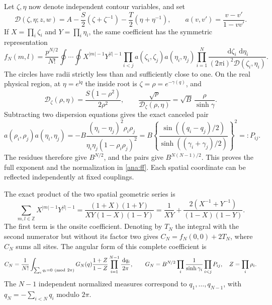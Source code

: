 \documentclass[11pt]{article}
\numberwithin{equation}{section}
\theoremstyle{definition}
\newcommand{\Z}{\mathbb Z}
\newcommand{\ii}{\mathrm i}
\newcommand{\dd}{\,\mathrm d}
\begin{document}
Let \(\zeta,\eta\) now denote independent contour variables, and set
\[
 \mathcal D(\zeta,\eta;z,w)=
 A-\frac S2(\zeta+\zeta^{-1})
  -\frac T2(\eta+\eta^{-1}),\qquad
 a(v,v')=\frac{v-v'}{1-vv'}.
\]
If \(X=\prod_i\zeta_i\) and \(Y=\prod_i\eta_i\), the same coefficient
has the symmetric representation
\begin{equation}\label{ana:doublecorr}
 f_N(m,l)=\frac{p^{N/2}}{N!}\oint\cdots\oint
 X^{|m|-1}Y^{|l|-1}
 \prod_{i<j}a(\zeta_i,\zeta_j)a(\eta_i,\eta_j)
 \prod_{i=1}^N
 \frac{\dd\zeta_i\,\dd\eta_i}{(2\pi\ii)^2\mathcal D(\zeta_i,\eta_i)}.
\end{equation}
The circles have radii strictly less than and sufficiently close to
one. On the real physical region, at \(\eta=e^{\ii q}\) the
inside root is \(\zeta=\rho=e^{-\gamma(q)}\), and
\[
 \mathcal D_\zeta(\rho,\eta)
   =\frac{S(1-\rho^2)}{2\rho^2},\qquad
 \frac{\sqrt p}{\mathcal D_\zeta(\rho,\eta)}
   =\sqrt B\,\frac{\rho}{\sinh\gamma}.
\]
Subtracting two dispersion equations gives the exact canceled pair
\begin{equation}\label{ana:pair}
 a(\rho_i,\rho_j)a(\eta_i,\eta_j)
 =-B\frac{(\eta_i-\eta_j)^2\rho_i\rho_j}
          {\eta_i\eta_j(1-\rho_i\rho_j)^2}
 =B\left\{\frac{\sin((q_i-q_j)/2)}
       {\sinh((\gamma_i+\gamma_j)/2)}\right\}^{\!2}
 =:P_{ij}.
\end{equation}
The residues therefore give \(B^{N/2}\), and the pairs give
\(B^{N(N-1)/2}\). This proves the full exponent and the normalization
in \eqref{ana:ff}. Each spatial coordinate can be reflected
independently at fixed couplings.

The exact product of the two spatial geometric series is
\begin{equation}\label{ana:fullsites}
 \sum_{m,l\in\Z}X^{|m|-1}Y^{|l|-1}
 =\frac{(1+X)(1+Y)}{XY(1-X)(1-Y)}
 =\frac1{XY}+\frac{2(X^{-1}+Y^{-1})}{(1-X)(1-Y)}.
\end{equation}
The first term is the onsite coefficient. Denoting by \(T_N\)
the integral with the second numerator but without its factor two
gives \(C_N=f_N(0,0)+2T_N\), where \(C_N\) sums all sites.
The angular form of this complete coefficient is
\begin{equation}\label{ana:angular}
 C_N=\frac1{N!}
 \int_{\sum_iq_i=0\ ({\rm mod}\ 2\pi)}
 G_N(q)\frac{1+Z}{1-Z}
 \prod_{i=1}^{N-1}\frac{\dd q_i}{2\pi},\qquad
 G_N=B^{N/2}\prod_i\frac1{\sinh\gamma_i}\prod_{i<j}P_{ij},
 \quad Z=\prod_i\rho_i.
\end{equation}
The \(N-1\) independent normalized measures correspond to
\(q_1,\ldots,q_{N-1}\), with \(q_N=-\sum_{i<N}q_i\) modulo \(2\pi\).
\end{document}
